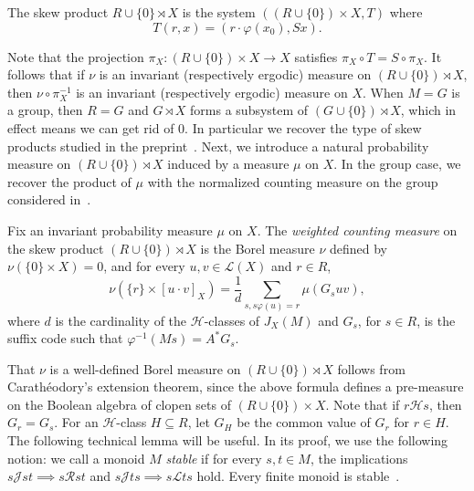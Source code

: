 \documentclass[a4paper,UKenglish,numberwithinsect,cleveref]{lipics-v2021}
\newcommand{\HH}{\mathrel{\mathscr{H}}}
\newcommand{\JJ}{\mathrel{\mathscr{J}}}
\newcommand{\RR}{\mathrel{\mathscr{R}}}
\newcommand{\LL}{\mathrel{\mathscr{L}}}
\newcommand{\cL}{\mathcal L}
\newcommand*{\from}{\colon}
\begin{document}
\begin{definition}
    The skew product $R\cup\{0\}\rtimes X$ is the system $((R\cup\{0\})\times X,T)$ where  
    \begin{equation*}
        T(r,x) = (r\cdot \varphi(x_0), Sx).
    \end{equation*}
\end{definition}

Note that the projection $\pi_X\from(R\cup\{0\})\times X\to X$ satisfies $\pi_X\circ T = S\circ\pi_X$. It follows that if $\nu$ is an invariant (respectively ergodic) measure on $(R\cup\{0\})\rtimes X$, then $\nu\circ\pi_X^{-1}$ is an invariant (respectively ergodic) measure on $X$.  When $M=G$ is a group, then $R=G$ and $G\rtimes X$ forms a subsystem of $(G\cup\{0\})\rtimes X$, which in effect means we can get rid of 0. In particular we recover the type of skew products studied in the preprint~\cite{BertheGouletOuelletNybergBroddaPerrinPetersen2024}. Next, we introduce a natural probability measure on $(R\cup\{0\})\rtimes X$ induced by a measure $\mu$ on $X$. In the group case, we recover the product of $\mu$ with the normalized counting measure on the group considered in~\cite{BertheGouletOuelletNybergBroddaPerrinPetersen2024}.

\begin{definition}
    Fix an invariant probability measure $\mu$ on $X$. The \emph{weighted counting measure} on the skew product $(R\cup\{0\})\rtimes X$ is the Borel measure $\nu$ defined by $\nu(\{0\}\times X)=0$, and for every $u,v\in\cL(X)$ and $r\in R$,
    \[
        \nu(\{r\}\times [u\cdot v]_X)=\frac1d\sum_{s,s\varphi(u)=r}\mu(G_suv),
    \]
    where $d$ is the cardinality of the $\HH$-classes of $J_X(M)$ and $G_s$, for $s\in R$, is the suffix code such that $\varphi^{-1}(Ms)=A^*G_s$.
\end{definition}

That $\nu$ is a well-defined Borel measure on $(R\cup\{0\})\rtimes X$ follows from Carathéodory's extension theorem, since the above formula defines a pre-measure on the Boolean algebra of clopen sets of $(R\cup\{0\})\times X$. Note that if $r\HH s$, then $G_r = G_s$. For an $\HH$-class $H\subseteq R$, let $G_H$ be the common value of $G_r$ for $r\in H$. The following technical lemma will be useful. In its proof, we use the following notion: we call a monoid $M$ \emph{stable} if for every $s,t\in M$, the implications 
    $s\JJ st \implies s\RR st$ and 
    $s\JJ ts \implies s\LL ts$
hold. Every finite monoid is stable~\cite[Lemma 1.1, Chapter V]{book/Grillet1995}.
\end{document}
